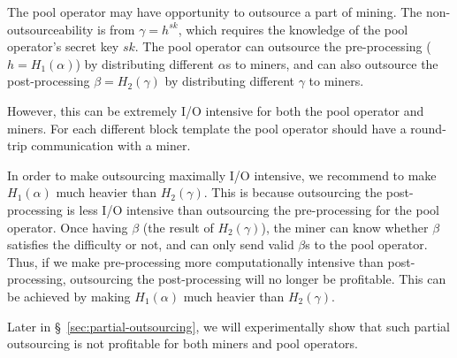 The pool operator may have opportunity to outsource a part of mining.
The non-outsourceability is from $\gamma = h^{sk}$, which requires the knowledge of the pool operator's secret key $sk$.
The pool operator can outsource the pre-processing ($h = H_1(\alpha)$) by distributing different $\alpha$s to miners, and can also outsource the post-processing $\beta = H_2(\gamma)$ by distributing different $\gamma$ to miners.

However, this can be extremely I/O intensive for both the pool operator and miners.
For each different block template the pool operator should have a round-trip communication with a miner.

In order to make outsourcing maximally I/O intensive, we recommend to make $H_1(\alpha)$ much heavier than $H_2(\gamma)$. 
This is because outsourcing the post-processing is less I/O intensive than outsourcing the pre-processing for the pool operator.
Once having $\beta$ (the result of $H_2(\gamma)$), the miner can know whether $\beta$ satisfies the difficulty or not, and can only send valid $\beta$s to the pool operator.
Thus, if we make pre-processing more computationally intensive than post-processing, outsourcing the post-processing will no longer be profitable.
This can be achieved by making $H_1(\alpha)$ much heavier than $H_2(\gamma)$.

Later in \S~\ref{sec:partial-outsourcing}, we will experimentally show that such partial outsourcing is not profitable for both miners and pool operators.



